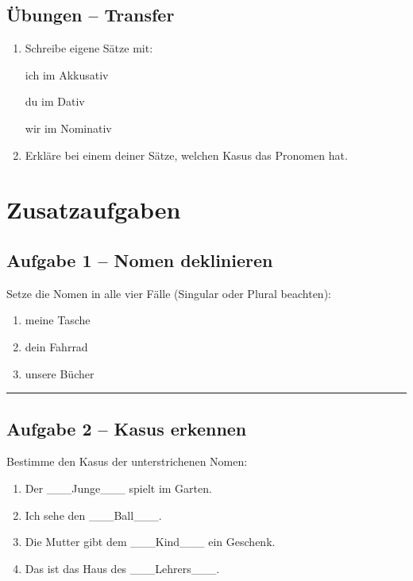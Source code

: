 \documentclass[a4paper,12pt]{article}
\newcommand{\linie}{\vspace{4pt}\hrule\vspace{10pt}}
\begin{document}
\subsection*{Übungen – Transfer}

\begin{enumerate}
\item Schreibe eigene Sätze mit:

ich im Akkusativ  

du im Dativ  

wir im Nominativ  

\item Erkläre bei einem deiner Sätze, welchen Kasus das Pronomen hat.
\end{enumerate}

\newpage
\section*{Zusatzaufgaben}

\subsection*{Aufgabe 1 – Nomen deklinieren}

Setze die Nomen in alle vier Fälle (Singular oder Plural beachten):

\begin{enumerate}
\item meine Tasche  
\item dein Fahrrad  
\item unsere Bücher  
\end{enumerate}

\linie

\subsection*{Aufgabe 2 – Kasus erkennen}

Bestimme den Kasus der unterstrichenen Nomen:

\begin{enumerate}
\item Der \_\_\_Junge\_\_\_ spielt im Garten.  
\item Ich sehe den \_\_\_Ball\_\_\_.  
\item Die Mutter gibt dem \_\_\_Kind\_\_\_ ein Geschenk.  
\item Das ist das Haus des \_\_\_Lehrers\_\_\_.  
\end{enumerate}
\end{document}
